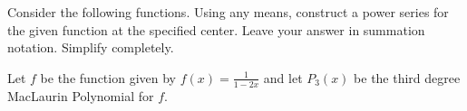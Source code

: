 \documentclass[addpoints]{exam}
\begin{document}
\begin{questions}
\begin{parts}

	\end{parts}

	\newpage

	\question[30] Consider the following functions. Using any means, construct a power series for the given function at the specified center. Leave your answer in summation notation. Simplify completely.


	\newpage

	\question Let $f$ be the function given by $\displaystyle f(x)=\frac{1}{1-2x}$ and let $P_3(x)$ be the third degree MacLaurin Polynomial for $f$.
\end{questions}
\end{document}
